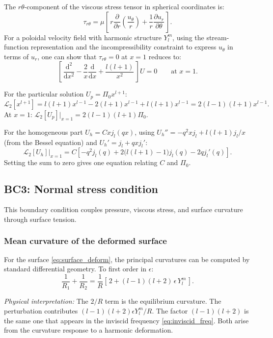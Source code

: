 \documentclass[12pt]{article}
\newcommand{\dd}{\mathrm{d}}
\theoremstyle{definition}
\begin{document}
The $r\theta$-component of the viscous stress tensor in spherical coordinates is:
\[
  \tau_{r\theta} = \mu\left[\,r\frac{\partial}{\partial r}\!\left(\frac{u_\theta}{r}\right) + \frac{1}{r}\frac{\partial u_r}{\partial\theta}\,\right].
\]
For a poloidal velocity field with harmonic structure $Y_l^m$, using the stream-function
representation and the incompressibility constraint to express $u_\theta$ in terms of $u_r$,
one can show that $\tau_{r\theta} = 0$ at
$x=1$ reduces to:
\begin{equation}
  \left[\,\frac{\dd^2}{\dd x^2} - \frac{2}{x}\frac{\dd}{\dd x} + \frac{l(l+1)}{x^2}\,\right]U = 0
  \qquad \text{at } x = 1.
  \label{eq:BC2}
\end{equation}

\begin{notebox}
For the particular solution $U_p = \Pi_0 x^{l+1}$:
\[
  \mathcal{L}_2[x^{l+1}] = l(l+1)x^{l-1} - 2(l+1)x^{l-1} + l(l+1)x^{l-1}
  = 2(l-1)(l+1)x^{l-1}.
\]
At $x=1$: $\mathcal{L}_2[U_p]|_{x=1} = 2(l-1)(l+1)\Pi_0$.

For the homogeneous part $U_h = Cxj_l(qx)$, using $U_h'' = -q^2 xj_l + l(l+1)j_l/x$
(from the Bessel equation) and $U_h' = j_l + qxj_l'$:
\[
  \mathcal{L}_2[U_h]\big|_{x=1}
  = C\!\left[-q^2 j_l(q) + 2\bigl(l(l+1)-1\bigr)j_l(q) - 2q j_l'(q)\right].
\]
Setting the sum to zero gives one equation relating $C$ and $\Pi_0$.
\end{notebox}

\subsection{BC3: Normal stress condition}

This boundary condition couples pressure, viscous stress, and surface curvature through surface tension.

\subsubsection{Mean curvature of the deformed surface}

\begin{derivbox}
For the surface \eqref{eq:surface_deform}, the principal curvatures can be computed
by standard differential geometry. To first order in $\epsilon$:
\begin{equation}
  \frac{1}{R_1} + \frac{1}{R_2}
  = \frac{1}{R}\!\left[\,2 + (l-1)(l+2)\,\epsilon\,Y_l^m\,\right].
  \label{eq:curvature}
\end{equation}

\textit{Physical interpretation:} The $2/R$ term is the equilibrium curvature.
The perturbation contributes $(l-1)(l+2)\epsilon Y_l^m/R$. The factor $(l-1)(l+2)$
is the same one that appears in the inviscid frequency \eqref{eq:inviscid_freq}.
Both arise from the curvature response to a harmonic
deformation.
\end{derivbox}
\end{document}
